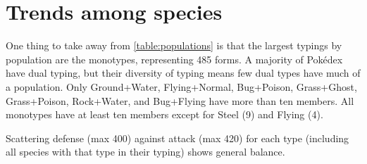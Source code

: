 \section{Trends among species}
One thing to take away from \autoref{table:populations} is that the largest
  typings by population are the monotypes, representing 485 forms.
A majority of Pokédex have dual typing, but their diversity of typing means few dual types have much of a population.
Only Ground+Water, Flying+Normal, Bug+Poison, Grass+Ghost, Grass+Poison, Rock+Water, and Bug+Flying
  have more than ten members.
All monotypes have at least ten members except for Steel (9) and Flying (4).

Scattering defense (max 400) against attack (max 420) for each type
  (including all species with that type in their typing) shows general
  balance.

